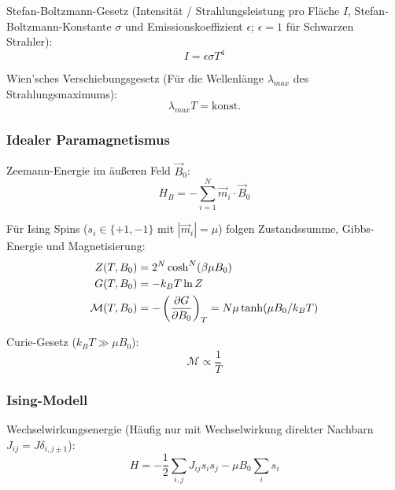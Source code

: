 \documentclass[11pt]{article}
\numberwithin{equation}{section}
\begin{document}
        Stefan-Boltzmann-Gesetz (Intensität / Strahlungsleistung pro Fläche $I$, Stefan-Boltzmann-Konstante $\sigma$ und Emissionskoeffizient $\epsilon$; $\epsilon=1$ für Schwarzen Strahler):
        \begin{equation}
          I = \epsilon\sigma T^4
        \end{equation}

        Wien'sches Verschiebungsgesetz (Für die Wellenlänge $\lambda_{max}$ des Strahlungsmaximums):
        \begin{equation}
          \lambda_{max} T = \mathrm{konst}.
        \end{equation}

      \subsubsection{Idealer Paramagnetismus}
        Zeemann-Energie im äußeren Feld $\vec{B}_0$:
        \begin{equation}
          H_B = -\sum_{i=1}^N \vec{m}_i \cdot \vec{B}_0
        \end{equation}

        Für Ising Spins ($s_i\in\lbrace +1, -1\rbrace$ mit $|\vec{m}_i| = \mu$) folgen Zustandssumme, Gibbs-Energie und Magnetisierung:
        \begin{equation}
          \begin{aligned}
            Z(T,B_0) &= 2^N \cosh^N (\beta\mu B_0) \\
            G(T,B_0) &= -k_B T \ln Z \\
            \mathcal{M}(T,B_0) &= -\left(\frac{\partial G}{\partial B_0}\right)_T = N\mu \tanh(\mu B_0 /k_B T)
          \end{aligned}
        \end{equation}

        Curie-Gesetz ($k_B T \gg \mu B_0$):
        \begin{equation}
          \mathcal{M} \propto \frac{1}{T}
        \end{equation}

      \subsubsection{Ising-Modell}
        Wechselwirkungsenergie (Häufig nur mit Wechselwirkung direkter Nachbarn $J_{ij} = J \delta_{i,j\pm 1}$):
        \begin{equation}
          H = -\frac{1}{2}\sum_{i,j} J_{ij} s_i s_j -\mu B_0 \sum_i s_i
        \end{equation}
\end{document}
